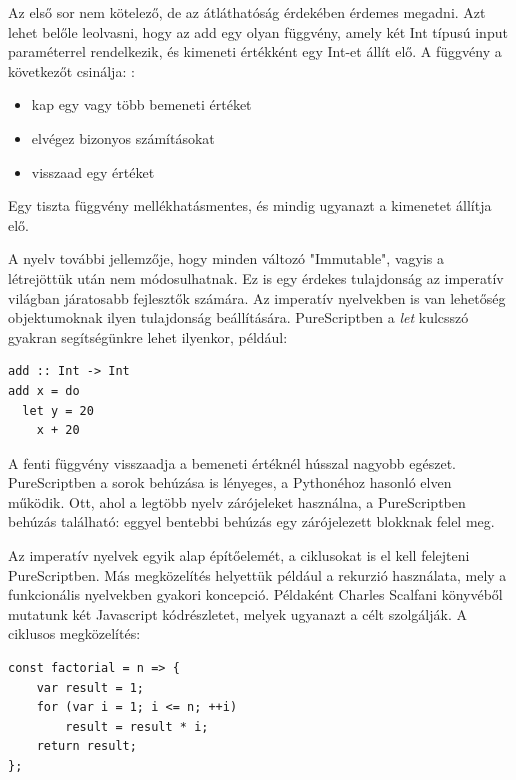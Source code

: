 \documentclass[12pt]{article}
\begin{document}
Az első sor nem kötelező,  de az átláthatóság érdekében érdemes megadni.  Azt lehet belőle leolvasni,  hogy az add egy olyan függvény,  amely két Int típusú input paraméterrel rendelkezik,  és kimeneti értékként egy Int-et állít elő. A függvény a következőt csinálja: \cite{CS}:
\begin{itemize}
\item kap egy vagy több bemeneti értéket
\item elvégez bizonyos számításokat
\item visszaad egy értéket
\end{itemize}
Egy tiszta függvény mellékhatásmentes, és mindig ugyanazt a kimenetet állítja elő\cite{CS}. 


A nyelv további jellemzője, hogy minden változó "Immutable", vagyis a létrejöttük után nem módosulhatnak. Ez is egy érdekes tulajdonság az imperatív világban járatosabb fejlesztők számára.  Az imperatív nyelvekben is van lehetőség objektumoknak ilyen tulajdonság beállítására.  PureScriptben a \textit{let} kulcsszó gyakran segítségünkre lehet ilyenkor, például:

\begin{verbatim}
add :: Int -> Int
add x = do
  let y = 20
    x + 20
\end{verbatim}
A fenti függvény visszaadja a bemeneti értéknél hússzal nagyobb egészet. PureScriptben a sorok behúzása is lényeges, a Pythonéhoz hasonló elven működik. Ott, ahol a legtöbb nyelv zárójeleket használna, a PureScriptben behúzás található: eggyel bentebbi behúzás egy zárójelezett blokknak felel meg.

Az imperatív nyelvek egyik alap építőelemét, a ciklusokat is el kell felejteni PureScriptben. Más megközelítés helyettük például a rekurzió használata, mely a funkcionális nyelvekben gyakori koncepció. Példaként Charles Scalfani könyvéből \cite{CS} mutatunk két Javascript kódrészletet, melyek ugyanazt a célt szolgálják. 
A ciklusos megközelítés:

\begin{verbatim}
const factorial = n => {
    var result = 1;
    for (var i = 1; i <= n; ++i)
        result = result * i;
    return result;
};
\end{verbatim}
\end{document}
